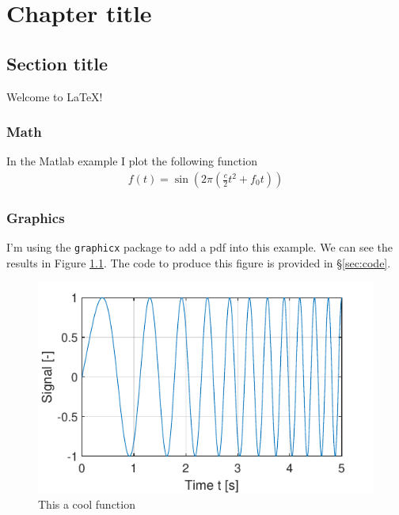 \documentclass[letterpaper,10pt,twoside]{report}
\begin{document}
\chapter{Chapter title}

\section{Section title}
Welcome to \LaTeX!

\subsection{Math}
In the Matlab example I plot the following function
\begin{align}
    f(t) = \sin\left( 2\pi \left( \frac{c}{2}t^2 + f_0 t \right) \right)
\end{align}

\subsection{Graphics}

I'm using the \texttt{graphicx} package to add a pdf into this example.
We can see the results in Figure \ref{fig:func1}.
The code to produce this figure is provided in \S\ref{sec:code}.

\begin{figure}[h!] %
    \centering
    \includegraphics[scale=1]{chirp}
    \caption{This a cool function}
    \label{fig:func1}
\end{figure}
\end{document}
